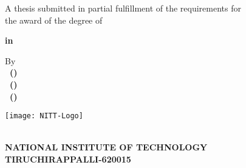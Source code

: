 \begin{titlepage}
\begin{center}
\fontsize{18pt}{1cm}\selectfont \textbf{\MakeUppercase\thetitle}

\vspace*{1.3cm}
\fontsize{14pt}{21pt}\selectfont A thesis submitted in partial fulfillment of the requirements for\\
the award of the degree of

\vspace*{0.4cm}
\fontsize{14pt}{1cm}\selectfont\textbf{\thedegree} 

\vspace*{0.4cm}
\textbf{in\\ \thedepartment}

\vspace*{2.0cm}
By\\
\textbf{\theauthora\ (\therollnoa)}\\
\textbf{\theauthorb\ (\therollnob)}\\
\textbf{\theauthorc\ (\therollnoc)}

\vspace*{1.2cm}
\texttt{[image: NITT-Logo]}


\fontsize{16pt}{16pt}\selectfont \textbf{\MakeUppercase\thedepartment\\NATIONAL INSTITUTE OF TECHNOLOGY\\TIRUCHIRAPPALLI-620015}

\vspace{0.31cm}
\textbf{\MakeUppercase\themonth\ \theyear}
\end{center}
\end{titlepage}
